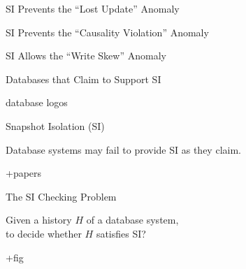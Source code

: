 \begin{frame}{SI Prevents the ``Lost Update'' Anomaly}
  \begin{center}
    

  \end{center}
\end{frame}

\begin{frame}{SI Prevents the ``Causality Violation'' Anomaly}
  \begin{center}
    
  \end{center}
\end{frame}

\begin{frame}{SI Allows the ``Write Skew'' Anomaly}
  \begin{center}
  \end{center}
\end{frame}

\begin{frame}{Databases that Claim to Support SI}
  \begin{center}
    database logos
  \end{center}
\end{frame}

\begin{frame}{Snapshot Isolation (SI)}
  \begin{center}
    Database systems may fail to provide SI as they claim.

    +papers
  \end{center}
\end{frame}

\begin{frame}{The SI Checking Problem}
  \begin{center}
    Given a history $H$ of a database system, \\[6pt]
    to decide whether $H$ satisfies SI?

    +fig
  \end{center}
\end{frame}

